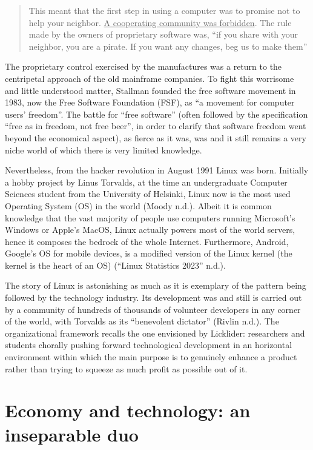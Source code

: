 \documentclass[
  a4paper,
]{book}
\begin{document}
\begin{quote}
This meant that the first step in using a computer was to promise not to help your neighbor. \uline{A cooperating community was forbidden}. The rule made by the owners of proprietary software was, ``if you share with your neighbor, you are a pirate. If you want any changes, beg us to make them''
\end{quote}

The proprietary control exercised by the manufactures was a return to the centripetal approach of the old mainframe companies. To fight this worrisome and little understood matter, Stallman founded the free software movement in 1983, now the Free Software Foundation (FSF), as ``a movement for computer users' freedom''. The battle for ``free software'' (often followed by the specification ``free as in freedom, not free beer'', in order to clarify that software freedom went beyond the economical aspect), as fierce as it was, was and it still remains a very niche world of which there is very limited knowledge.

Nevertheless, from the hacker revolution in August 1991 Linux was born. Initially a hobby project by Linus Torvalds, at the time an undergraduate Computer Sciences student from the University of Helsinki, Linux now is the most used Operating System (OS) in the world {(Moody n.d.)}. Albeit it is common knowledge that the vast majority of people use computers running Microsoft's Windows or Apple's MacOS, Linux actually powers most of the world servers, hence it composes the bedrock of the whole Internet. Furthermore, Android, Google's OS for mobile devices, is a modified version of the Linux kernel (the kernel is the heart of an OS) {({``Linux {Statistics} 2023''} n.d.)}.

The story of Linux is astonishing as much as it is exemplary of the pattern being followed by the technology industry. Its development was and still is carried out by a community of hundreds of thousands of volunteer developers in any corner of the world, with Torvalds as its ``benevolent dictator'' {(Rivlin n.d.)}. The organizational framework recalls the one envisioned by Licklider: researchers and students chorally pushing forward technological development in an horizontal environment within which the main purpose is to genuinely enhance a product rather than trying to squeeze as much profit as possible out of it.

\hypertarget{economy-and-technology-an-inseparable-duo}{%
\section{Economy and technology: an inseparable duo}\label{economy-and-technology-an-inseparable-duo}}
\end{document}
